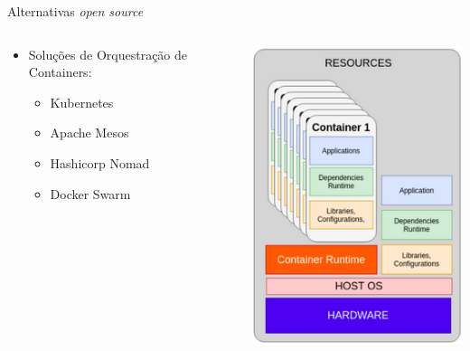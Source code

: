 \documentclass[10pt,brazil]{beamer}
\theoremstyle{definition}
\begin{document}
\begin{frame}{Alternativas \emph{open source}}
  \begin{columns}
    \begin{column}{0.5\textwidth}
      \begin{itemize}
        \item Soluções de Orquestração de Containers:
              \begin{itemize}
                \item Kubernetes\textregistered
                \item Apache Mesos\textregistered
                \item Hashicorp Nomad\textregistered\*
                \item Docker Swarm\textregistered
              \end{itemize}
      \end{itemize}
    \end{column}
    \begin{column}{0.5\textwidth}  %
      \begin{center}
        \includegraphics[width=1\textwidth]{containers.png}
      \end{center}
    \end{column}
  \end{columns}
\end{frame}
\end{document}
